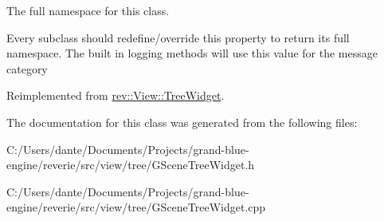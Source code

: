 The full namespace for this class. 

Every subclass should redefine/override this property to return its full namespace. The built in logging methods will use this value for the message category 

Reimplemented from \mbox{\hyperlink{classrev_1_1_view_1_1_tree_widget_a09be824e34e50e9622c3dc333c9a3c07}{rev\+::\+View\+::\+Tree\+Widget}}.



The documentation for this class was generated from the following files\+:\begin{DoxyCompactItemize}
\item 
C\+:/\+Users/dante/\+Documents/\+Projects/grand-\/blue-\/engine/reverie/src/view/tree/G\+Scene\+Tree\+Widget.\+h\item 
C\+:/\+Users/dante/\+Documents/\+Projects/grand-\/blue-\/engine/reverie/src/view/tree/G\+Scene\+Tree\+Widget.\+cpp\end{DoxyCompactItemize}
